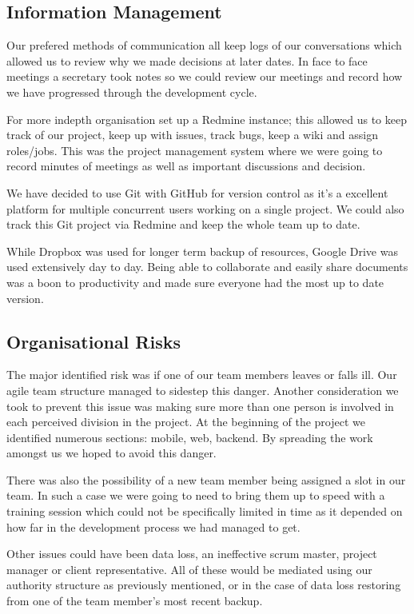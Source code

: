 \documentclass{l3proj}
\begin{document}
\subsection{Information Management}		Our prefered methods of communication all keep logs of our conversations which allowed us to review why we made decisions at later dates. In face to face meetings a secretary took notes so we could review our meetings and record how we have progressed through the development cycle.

For more indepth organisation set up a Redmine instance; this allowed us to keep track of our project, keep up with issues, track bugs, keep a wiki and assign roles/jobs. This was the project management system where we were going to record minutes of meetings as well as important discussions and decision.

We have decided to use \gls{Git} with GitHub for version control as it’s a excellent platform for multiple concurrent users working on a single project. We could also track this Git project via Redmine and keep the whole team up to date.

While Dropbox was used for longer term backup of resources, Google Drive was used extensively day to day. Being able to collaborate and easily share documents was a boon to productivity and made sure everyone had the most up to date version.

\subsection{Organisational Risks}		The major identified risk was if one of our team members leaves or falls ill. Our agile team structure managed to sidestep this danger. Another consideration we took to prevent this issue was making sure more than one person is involved in each perceived division in the project. At the beginning of the project we identified numerous sections: mobile, web, backend. By spreading the work amongst us we hoped to avoid this danger.

There was also the possibility of a new team member being assigned a slot in our team. In such a case we were going to need to bring them up to speed with a training session which could not be specifically limited in time as it depended on how far in the development process we had managed to get.

Other issues could have been data loss, an ineffective scrum master, project manager or client representative. All of these would be mediated using our authority structure as previously mentioned, or in the case of data loss restoring from one of the team member's most recent backup.
\end{document}
